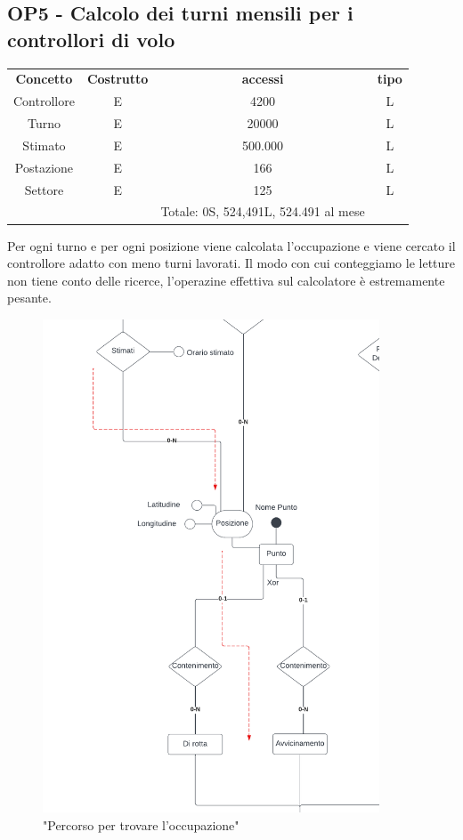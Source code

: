     \subsection*{OP5 - Calcolo dei turni mensili per i controllori di volo}
    \begin{table}[H]
    \centering
    \begin{tabular}{cccc}
  
    \rowcolor{tableheadercolor}
    \textbf{Concetto} & \textbf{Costrutto} & \textbf{accessi} & \textbf{tipo}\\
  
    Controllore & E & 4200 & L \\
    Turno & E & 20000 & L \\
    Stimato & E & 500.000 & L \\
    Postazione & E & 166 & L \\
    Settore & E & 125 & L \\
    & & Totale: 0S, 524,491L, 524.491 al mese &\\
  
    \end{tabular}
    \end{table}
    Per ogni turno e per ogni posizione viene calcolata l'occupazione e viene cercato il controllore adatto con meno turni lavorati.
    Il modo con cui conteggiamo le letture non tiene conto delle ricerce, l'operazine effettiva sul calcolatore è estremamente pesante.
    \begin{figure}[H]
      \centering
      \includegraphics[width=10cm]{figures/BasicControllerarrowsp1.pdf}
      \caption{"Percorso per trovare l'occupazione"}
    \end{figure}
